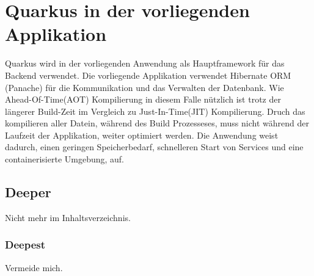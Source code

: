 

\section{Quarkus in der vorliegenden Applikation}
Quarkus wird in der vorliegenden Anwendung als Hauptframework für das Backend verwendet. 
Die vorliegende Applikation verwendet Hibernate ORM (Panache) für die Kommunikation und das Verwalten der Datenbank.
Wie Ahead-Of-Time(AOT) Kompilierung in diesem Falle nützlich ist trotz der längerer Build-Zeit im Vergleich zu Just-In-Time(JIT) Kompilierung. 
Druch das kompilieren aller Datein, während des Build Prozesseses, muss nicht während der Laufzeit der Applikation, weiter optimiert werden.
Die Anwendung weist dadurch, einen geringen Speicherbedarf, schnelleren Start von Services und eine containerisierte Umgebung, auf.


\subsection{Deeper}
Nicht mehr im Inhaltsverzeichnis.

\subsubsection{Deepest}
Vermeide mich.